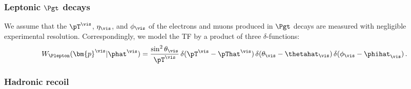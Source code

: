 \subsubsection{Leptonic $\Pgt$ decays}
\label{sec:mem_TF_tauToLepDecays}

We assume that the $\pT^{\vis}$, $\eta_{\vis}$, and $\phi_{\vis}$
of the electrons and muons produced in $\Pgt$ decays are measured with negligible experimental resolution.
Correspondingly, we model the TF by a product of three $\delta$-functions:
\begin{equation}
W_{\Plepton}( \bm{p}^{\vis} | \phat^{\vis} ) =  
 \frac{\sin^{2} \theta_{\vis}}{\pT^{\vis}} \, 
  \delta( \pT^{\vis} - \pThat^{\vis} ) \, 
  \delta( \theta_{\vis} - \thetahat_{\vis} ) \, 
  \delta( \phi_{\vis} - \phihat_{\vis} ) \, .
\label{eq:tf_tauToLepDecays}
\end{equation}


\subsubsection{Hadronic recoil}
\label{sec:mem_TF_hadRecoil}

